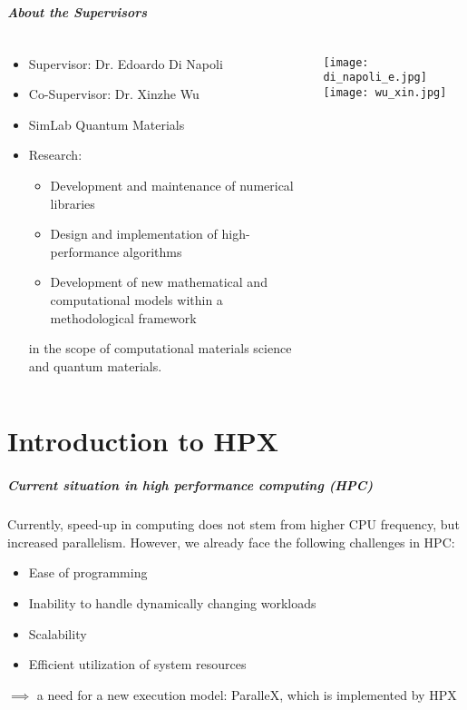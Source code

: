 \begin{frame}
\frametitle{About the Supervisors}
\begin{columns}[T]
 \begin{column}{.5\textwidth}
  \begin{itemize}
  \item Supervisor: Dr. Edoardo Di Napoli
  \item Co-Supervisor: Dr. Xinzhe Wu
  \item SimLab Quantum Materials
  \item Research:
    \begin{itemize}
    \item Development and maintenance of numerical libraries
    \item Design and implementation of high-performance algorithms
    \item Development of new mathematical and computational models within a methodological framework
    \end{itemize}
    in the scope of computational materials science and quantum materials.
  \end{itemize}
 \end{column}
 \begin{column}{.5\textwidth}
 \begin{center}
  \texttt{[image: di\_napoli\_e.jpg]}\texttt{[image: wu\_xin.jpg]}
 \end{center}
 \end{column}
\end{columns}


\end{frame}

\part{Introduction to HPX}
\makepart

\begin{frame}
\frametitle{Current situation in high performance computing (HPC)}
Currently, speed-up in computing does not stem from higher CPU frequency, but increased parallelism.
However, we already face the following challenges in HPC:
\begin{itemize}
  \item Ease of programming
  \item Inability to handle dynamically changing workloads
  \item Scalability
  \item Efficient utilization of system resources
\end{itemize}
\(\implies\) a need for a new execution model: ParalleX, which is implemented by HPX
\end{frame}

